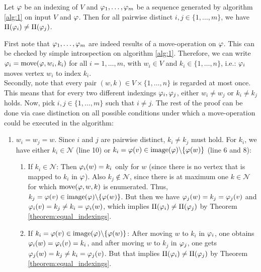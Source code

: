 \begin{lemmarep}
    Let $\varphi$ be an indexing of $V$ and $\varphi_1,\dots,\varphi_m$ be a sequence generated by algorithm \ref{alg:1} on input $V$ and $\varphi$. Then for all pairwise distinct $i,j \in \{1,\dots,m\}$, we have $\Pi(\varphi_i) \neq \Pi(\varphi_j)$. \label{lemma:pairwise_distinctiveness}
\end{lemmarep}
\begin{appendixproof}
    First note that $\varphi_1,\dots,\varphi_m$ are indeed results of a move-operation on $\varphi$. This can be checked by simple introspection on algorithm \ref{alg:1}. Therefore, we can write $\varphi_i = \mathrm{move}(\varphi,w_i,k_i)$ for all $i=1,\dots,m$, with $w_i \in V$ and $k_i \in \{1,\dots,n\}$, i.e.: $\varphi_i$ moves vertex $w_i$ to index $k_i$. \\
    Secondly, note that every pair $(w,k) \in V \times \{1,\dots,n\}$ is regarded at most once. This means that for every two different indexings $\varphi_i,\varphi_j$, either $w_i \neq w_j$ or $k_i \neq k_j$ holds. Now, pick $i,j \in \{1,\dots,m\}$ such that $i \neq j$. The rest of the proof can be done via case distinction on all possible conditions under which a move-operation could be executed in the algorithm:
    \begin{enumerate}
        \item $w_i = w_j = w$. Since $i$ and $j$ are pairwise distinct, $k_i \neq k_j$ must hold. For $k_i$, we have either $k_i \in \mathcal{N}$ (line 10) or $k_i = \varphi(v) \in \mathrm{image}(\varphi)\backslash \{ \varphi(w) \}$ (line 6 and 8):
        \begin{enumerate}
            \item If $k_i \in \mathcal{N}$: Then $\varphi_i(w) = k_i$ only for $w$ (since there is no vertex that is mapped to $k_i$ in $\varphi$). Also $k_j \not\in \mathcal{N}$, since there is at maximum one $k \in \mathcal{N}$ for which $\mathrm{move}(\varphi,w,k)$ is enumerated. Thus, $k_j = \varphi(v) \in \mathrm{image}(\varphi)\backslash \{ \varphi(w) \}$. But then we have $\varphi_j(w) = k_j =\varphi_j(v)$ and $\varphi_i(v) = k_j \neq k_i = \varphi_i(w)$, which implies $\Pi(\varphi_i) \neq \Pi(\varphi_j)$ by Theorem \ref{theorem:equal_indexings}.
            \item If $k_i = \varphi(v) \in \mathrm{image}(\varphi)\backslash \{\varphi(w) \}$: After moving $w$ to $k_i$ in $\varphi_i$, one obtains $\varphi_i(w) = \varphi_i(v) = k_i$, and after moving $w$ to $k_j$ in $\varphi_j$, one gets $\varphi_j(w) = k_j \neq k_i = \varphi_j(v)$. But that implies $\Pi(\varphi_i) \neq \Pi(\varphi_j)$ by Theorem \ref{theorem:equal_indexings}.  

\end{enumerate}
\end{enumerate}
\end{appendixproof}
